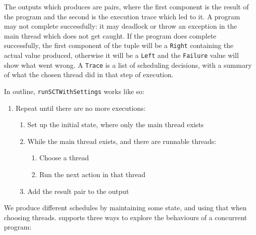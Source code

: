 The outputs which \dejafu{} produces are pairs, where the first
component is the result of the program and the second is the execution
trace which led to it.  A program may not complete successfully: it
may deadlock or throw an exception in the main thread which does not
get caught.  If the program does complete successfully, the first
component of the tuple will be a \verb|Right| containing the actual
value produced, otherwise it will be a \verb|Left| and the
\verb|Failure| value will show what went wrong.  A \verb|Trace| is a
list of scheduling decisions, with a summary of what the chosen thread
did in that step of execution.

In outline, \verb|runSCTWithSettings| works like so:

\begin{enumerate}
\item Repeat until there are no more executions:
  \begin{enumerate}
  \item Set up the initial state, where only the main thread exists
  \item While the main thread exists, and there are runnable threads:
    \begin{enumerate}
    \item Choose a thread
    \item Run the next action in that thread
    \end{enumerate}
  \item Add the result pair to the output
  \end{enumerate}
\end{enumerate}

We produce different schedules by maintaining some state, and using
that when choosing threads.  \dejafu{} supports three ways to explore
the behaviours of a concurrent program:

